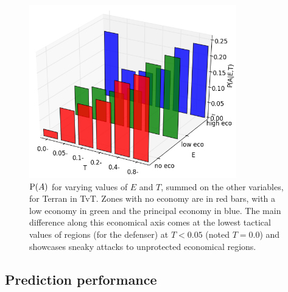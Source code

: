 \begin{figure}[!h]
\centerline{\includegraphics[width=9cm]{images/where3D_EI_TI_RegT.png}}
\caption{$\mathrm{P}(A)$ for varying values of $E$ and $T$, summed on the other variables, for Terran in TvT. Zones with no economy are in red bars, with a low economy in green and the principal economy in blue. The main difference along this economical axis comes at the lowest tactical values of regions (for the defenser) at $T<0.05$ (noted $T=0.0$) and showcases sneaky attacks to unprotected economical regions.}
\label{fig:Where3D}
\end{figure}

\subsection{Prediction performance}
